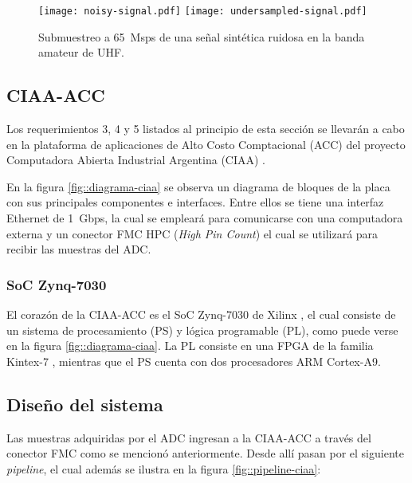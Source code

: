 \documentclass[../../main.tex]{subfiles}
\begin{document}
\begin{figure}[H]
    \centering
    {\texttt{[image: noisy-signal.pdf]}}
    \hspace{\fill}%
    {\texttt{[image: undersampled-signal.pdf]}}
    \caption{Submuestreo a 65~Msps de una señal sintética ruidosa en la banda amateur de UHF.}
    \label{fig::undersampling}
\end{figure}


\subsection{CIAA-ACC}
Los requerimientos 3, 4 y 5 listados al principio de esta sección se llevarán a cabo en la plataforma de aplicaciones de Alto Costo Comptacional (ACC) \cite{CIAA-ACC} del proyecto Computadora Abierta Industrial Argentina (CIAA) \cite{CIAA}.


En la figura \ref{fig::diagrama-ciaa} se observa un diagrama de bloques de la placa con sus principales componentes e interfaces. Entre ellos se tiene una interfaz Ethernet de 1~Gbps, la cual se empleará para comunicarse con una computadora externa y un conector FMC HPC (\textit{High Pin Count}) el cual se utilizará para recibir las muestras del ADC.

\subsubsection{SoC Zynq-7030}
El corazón  de la CIAA-ACC es el SoC Zynq-7030 de Xilinx \cite{SoC}, el cual consiste de un sistema de procesamiento (PS) y lógica programable (PL), como puede verse en la figura \ref{fig::diagrama-ciaa}. La PL consiste en una FPGA de la familia Kintex-7 \cite{Kintex-7}, mientras que el PS cuenta con dos procesadores ARM Cortex-A9.


\subsection{Diseño del sistema}
Las muestras adquiridas por el ADC ingresan a la CIAA-ACC a través del conector FMC como se mencionó anteriormente. Desde allí pasan por el siguiente \textit{pipeline}, el cual además se ilustra en la figura \ref{fig::pipeline-ciaa}:
\end{document}
